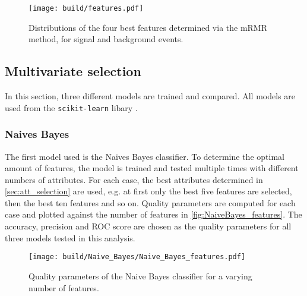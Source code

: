 \begin{figure}[H]
  \centering
  \texttt{[image: build/features.pdf]}
  \caption{Distributions of the four best features determined via the mRMR method, for signal and background events.}
  \label{fig:features}
\end{figure}

\subsection{Multivariate selection}

In this section, three different models are trained and compared. All models are used from the \texttt{scikit-learn}
libary \cite{scikit-learn}.

\subsubsection{Naives Bayes}

The first model used is the Naives Bayes classifier. To determine the optimal amount of
features, the model is trained and tested multiple times with different numbers of attributes.
For each case, the best attributes determined in \autoref{sec:att_selection} are used, e.g. at first 
only the best five features are selected, then the best ten features and so on.
Quality parameters are computed for each case and plotted against the number of features in \autoref{fig:NaiveBayes_features}.
The accuracy, precision and ROC score are chosen as the quality parameters for all three
models tested in this analysis.

\begin{figure}[H]
  \centering
  \texttt{[image: build/Naive\_Bayes/Naive\_Bayes\_features.pdf]}
  \caption{Quality parameters of the Naive Bayes classifier for a varying number of features.}
  \label{fig:NaiveBayes_features}
\end{figure}

